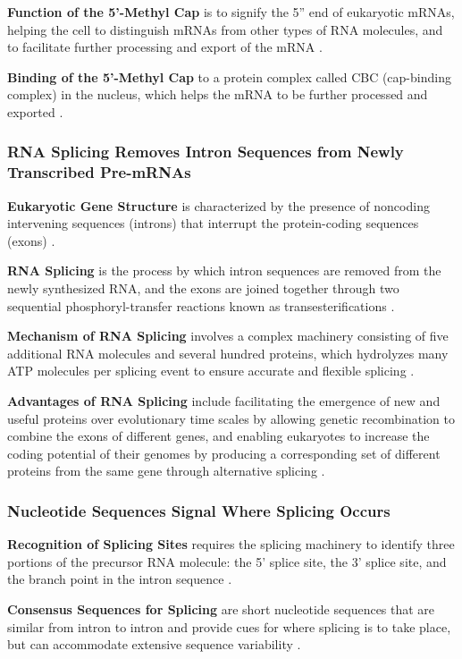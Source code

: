 \textbf{Function of the 5'-Methyl Cap} is to signify the 5'' end of eukaryotic mRNAs, helping the cell to distinguish mRNAs from other types of RNA molecules, and to facilitate further processing and export of the mRNA \cite*{L1-Chapter6}.

\textbf{Binding of the 5'-Methyl Cap} to a protein complex called CBC (cap-binding complex) in the nucleus, which helps the mRNA to be further processed and exported \cite*{L1-Chapter6}.

\subsubsection*{RNA Splicing Removes Intron Sequences from Newly Transcribed Pre-mRNAs}
\textbf{Eukaryotic Gene Structure} is characterized by the presence of noncoding intervening sequences (introns) that interrupt the protein-coding sequences (exons) \cite*{L1-Chapter6}.

\textbf{RNA Splicing} is the process by which intron sequences are removed from the newly synthesized RNA, and the exons are joined together through two sequential phosphoryl-transfer reactions known as transesterifications \cite*{L1-Chapter6}.

\textbf{Mechanism of RNA Splicing} involves a complex machinery consisting of five additional RNA molecules and several hundred proteins, which hydrolyzes many ATP molecules per splicing event to ensure accurate and flexible splicing \cite*{L1-Chapter6}.

\textbf{Advantages of RNA Splicing} include facilitating the emergence of new and useful proteins over evolutionary time scales by allowing genetic recombination to combine the exons of different genes, and enabling eukaryotes to increase the coding potential of their genomes by producing a corresponding set of different proteins from the same gene through alternative splicing \cite*{L1-Chapter6}.

\subsubsection*{Nucleotide Sequences Signal Where Splicing Occurs}
\textbf{Recognition of Splicing Sites} requires the splicing machinery to identify three portions of the precursor RNA molecule: the 5' splice site, the 3' splice site, and the branch point in the intron sequence \cite*{L1-Chapter6}.

\textbf{Consensus Sequences for Splicing} are short nucleotide sequences that are similar from intron to intron and provide cues for where splicing is to take place, but can accommodate extensive sequence variability \cite*{L1-Chapter6}.

